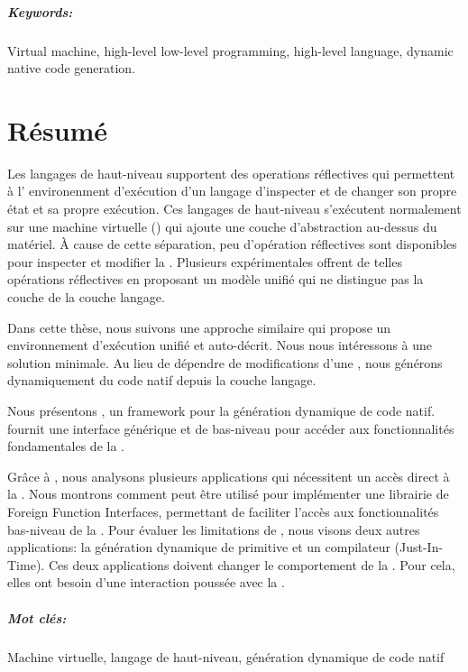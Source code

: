 \documentclass[a4paper,11pt,twoside]{include/ThesisStyle}
\begin{document}
\paragraph{Keywords:} Virtual machine, high-level low-level programming, high-level language, dynamic native code generation.

\cleardoublepage
\chapter*{Résumé}
Les langages de haut-niveau supportent des operations réflectives qui permettent à l’ environenment d’exécution d’un langage d’inspecter et de changer son propre état et sa propre exécution.
Ces langages de haut-niveau s’exécutent normalement sur une machine virtuelle (\VM) qui ajoute une couche d’abstraction au-dessus du matériel.
À cause de cette séparation, peu d’opération réflectives sont disponibles pour inspecter et modifier la \VM.
Plusieurs \VMs expérimentales offrent de telles opérations réflectives en proposant un modèle unifié qui ne distingue pas la couche \VM de la couche langage. 

Dans cette thèse, nous suivons une approche similaire qui propose un environnement d’exécution unifié et auto-décrit.
Nous nous intéressons à une solution minimale.
Au lieu de dépendre de modifications d’une \VM, nous générons dynamiquement du code natif depuis la couche langage. 

Nous présentons \B, un framework pour la génération dynamique de code natif.
\B fournit une interface générique et de bas-niveau pour accéder aux fonctionnalités fondamentales de la \VM.

Grâce à \B, nous analysons plusieurs applications qui nécessitent un accès direct à la \VM.
Nous montrons comment \B peut être utilisé pour implémenter une librairie de Foreign Function Interfaces, permettant de faciliter l’accès aux fonctionnalités bas-niveau de la \VM.
Pour évaluer les limitations de \B, nous visons deux autres applications: la génération dynamique de primitive et un compilateur \JIT (Just-In-Time).
Ces deux applications doivent changer le comportement de la \VM.
Pour cela, elles ont besoin d’une interaction poussée avec la \VM.

\paragraph{Mot clés:} Machine virtuelle, langage de haut-niveau, génération dynamique de code natif
 
\end{document}
